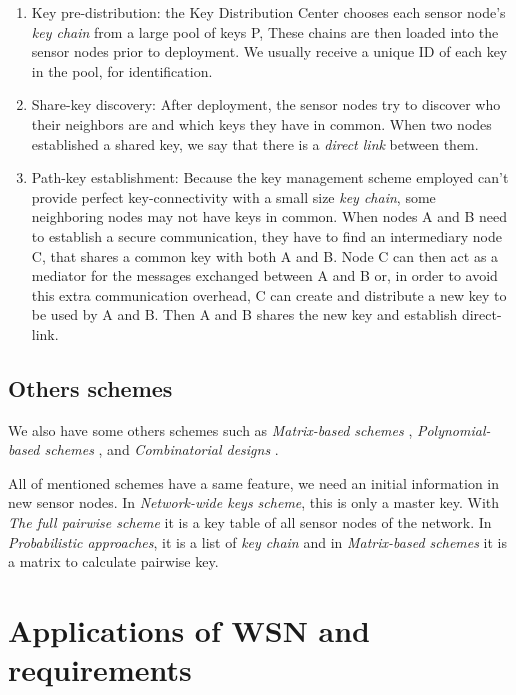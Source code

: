 \begin{enumerate}
\item Key pre-distribution: the Key Distribution Center chooses each sensor node's \emph{key chain} from a large pool of keys P, These chains are then loaded into the sensor nodes prior to deployment. We usually receive a unique ID of each key in the pool, for identification.
\item Share-key discovery: After deployment, the sensor nodes try to discover who their neighbors are and which keys they have in common. When two nodes established a shared key, we say that there is a \emph{direct link} between them.
\item Path-key establishment: Because the key management scheme employed can't provide perfect key-connectivity with a small size \emph{key chain}, some neighboring nodes may not have keys in common. When nodes A and B need to establish a secure communication, they have to find an intermediary node C, that shares a common key with both A and B. Node C can then act as a mediator for the messages exchanged between A and B or, in order to avoid this extra communication overhead, C can create and distribute a new key to be used by A and B. Then A and B shares the new key and establish direct-link.
\end{enumerate}

\subsection{Others schemes}

We also have some others schemes such as \emph{Matrix-based schemes} \cite{blom}, \emph{Polynomial-based schemes} \cite{Du:2003:PKP:948109.948118}, and \emph{Combinatorial designs} \cite{ios}.

All of mentioned schemes have a same feature, we need an initial information in new sensor nodes. In \emph{Network-wide keys scheme}, this is only a master key. With \emph{The full pairwise scheme} it is a key table of all sensor nodes of the network. In \emph{Probabilistic approaches}, it is a list of \emph{key chain} and in \emph{Matrix-based schemes} it is a matrix to calculate pairwise key.

\section{Applications of WSN and requirements}\label{sec:bg_appli}

